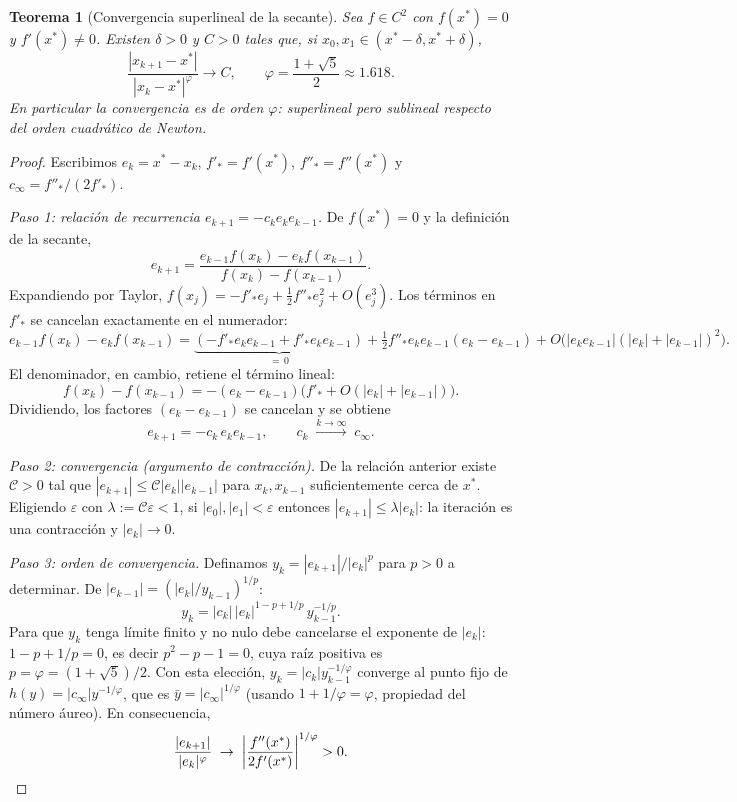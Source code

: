 \documentclass[a4paper,11pt]{report}
\newtheorem{theorem}{Teorema}[chapter]
\begin{document}
\begin{theorem}[Convergencia superlineal de la secante]\label{thm:secante_conv}
Sea $f\in C^2$ con $f(x^*)=0$ y $f'(x^*)\ne 0$.
Existen $\delta>0$ y $C>0$ tales que, si $x_0,x_1\in(x^*-\delta,x^*+\delta)$,
\[
\frac{|x_{k+1}-x^*|}{|x_k-x^*|^{\varphi}}\to C,\qquad
\varphi=\frac{1+\sqrt{5}}{2}\approx 1.618.
\]
En particular la convergencia es de orden $\varphi$: superlineal pero sublineal
respecto del orden cuadrático de Newton.
\end{theorem}

\begin{proof}
Escribimos $e_k=x^*-x_k$, $f'_*=f'(x^*)$, $f''_*=f''(x^*)$ y $c_\infty=f''_*/(2f'_*)$.

\textit{Paso 1: relación de recurrencia $e_{k+1}=-c_k e_k e_{k-1}$.}
De $f(x^*)=0$ y la definición de la secante,
\[
e_{k+1}=\frac{e_{k-1}f(x_k)-e_k f(x_{k-1})}{f(x_k)-f(x_{k-1})}.
\]
Expandiendo por Taylor, $f(x_j)=-f'_* e_j+\tfrac12 f''_* e_j^2+O(e_j^3)$.
Los términos en $f'_*$ se cancelan exactamente en el numerador:
\[
e_{k-1}f(x_k)-e_k f(x_{k-1})
=\underbrace{(-f'_*e_ke_{k-1}+f'_*e_ke_{k-1})}_{=\,0}
+\tfrac12 f''_* e_ke_{k-1}(e_k-e_{k-1})
+O\bigl(|e_ke_{k-1}|(|e_k|+|e_{k-1}|)^2\bigr).
\]
El denominador, en cambio, retiene el término lineal:
\[
f(x_k)-f(x_{k-1})=-(e_k-e_{k-1})\bigl(f'_*+O(|e_k|+|e_{k-1}|)\bigr).
\]
Dividiendo, los factores $(e_k-e_{k-1})$ se cancelan y se obtiene
\[
e_{k+1}=-c_k\,e_k e_{k-1},\qquad c_k\;\xrightarrow{k\to\infty}\;c_\infty.
\]

\textit{Paso 2: convergencia (argumento de contracción).}
De la relación anterior existe $\mathcal{C}>0$ tal que
$|e_{k+1}|\le\mathcal{C}|e_k||e_{k-1}|$ para $x_k,x_{k-1}$ suficientemente
cerca de $x^*$.
Eligiendo $\varepsilon$ con $\lambda:=\mathcal{C}\varepsilon<1$,
si $|e_0|,|e_1|<\varepsilon$ entonces $|e_{k+1}|\le\lambda|e_k|$:
la iteración es una contracción y $|e_k|\to0$.

\textit{Paso 3: orden de convergencia.}
Definamos $y_k=|e_{k+1}|/|e_k|^p$ para $p>0$ a determinar.
De $|e_{k-1}|=(|e_k|/y_{k-1})^{1/p}$:
\[
y_k=|c_k|\,|e_k|^{1-p+1/p}\,y_{k-1}^{-1/p}.
\]
Para que $y_k$ tenga límite finito y no nulo debe cancelarse el exponente de $|e_k|$:
$1-p+1/p=0$, es decir $p^2-p-1=0$, cuya raíz positiva es $p=\varphi=(1+\sqrt5)/2$.
Con esta elección, $y_k=|c_k|y_{k-1}^{-1/\varphi}$ converge al punto fijo de
$h(y)=|c_\infty|y^{-1/\varphi}$, que es $\bar y=|c_\infty|^{1/\varphi}$
(usando $1+1/\varphi=\varphi$, propiedad del número áureo).
En consecuencia,
\[
\frac{|e_{k+1}|}{|e_k|^\varphi}\;\to\;\left|\frac{f''(x^*)}{2f'(x^*)}\right|^{1/\varphi}>0.\qedhere
\]
\end{proof}
\end{document}
